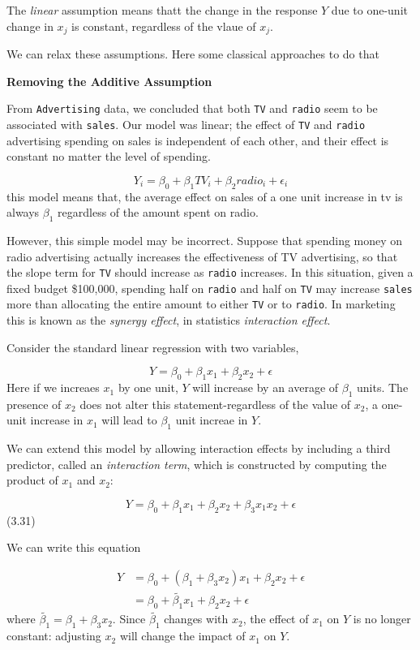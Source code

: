 \documentclass[
  letterpaper,
  DIV=11,
  numbers=noendperiod]{scrreprt}
\begin{document}
The \emph{linear} assumption means thatt the change in the response
\(Y\) due to one-unit change in \(x_j\) is constant, regardless of the
vlaue of \(x_j\).

We can relax these assumptions. Here some classical approaches to do
that

\textbf{Removing the Additive Assumption}

From \texttt{Advertising} data, we concluded that both \texttt{TV} and
\texttt{radio} seem to be associated with \texttt{sales}. Our model was
linear; the effect of \texttt{TV} and \texttt{radio} advertising
spending on sales is independent of each other, and their effect is
constant no matter the level of spending.

\[
Y_i = \beta_0 + \beta_1 TV_i + \beta_2 radio_i + \epsilon_i
\] this model means that, the average effect on sales of a one unit
increase in tv is always \(\beta_1\) regardless of the amount spent on
radio.

However, this simple model may be incorrect. Suppose that spending money
on radio advertising actually increases the effectiveness of TV
advertising, so that the slope term for \texttt{TV} should increase as
\texttt{radio} increases. In this situation, given a fixed budget
\$100,000, spending half on \texttt{radio} and half on \texttt{TV} may
increase \texttt{sales} more than allocating the entire amount to either
\texttt{TV} or to \texttt{radio}. In marketing this is known as the
\emph{synergy effect}, in statistics \emph{interaction effect}.

Consider the standard linear regression with two variables,

\[
Y = \beta_0 + \beta_1x_1 + \beta_2x_2 + \epsilon
\] Here if we increaes \(x_1\) by one unit, \(Y\) will increase by an
average of \(\beta_1\) units. The presence of \(x_2\) does not alter
this statement-regardless of the value of \(x_2\), a one-unit increase
in \(x_1\) will lead to \(\beta_1\) unit increae in \(Y\).

We can extend this model by allowing interaction effects by including a
third predictor, called an \emph{interaction term}, which is constructed
by computing the product of \(x_1\) and \(x_2\):

\[
Y = \beta_0 + \beta_1 x_1 + \beta_2 x_2 + \beta_3 x_1 x_2 + \epsilon
\] (3.31)

We can write this equation

\[
\begin{align}
Y &= \beta_0 + (\beta_1 + \beta_3 x_2)x_1 + \beta_2x_2 +\epsilon \\
&= \beta_0 + \tilde{\beta_1}x_1 + \beta_2x_2 + \epsilon
\end{align}
\] where \(\tilde{\beta_1} = \beta_1 + \beta_3x_2\). Since
\(\tilde{\beta_1}\) changes with \(x_2\), the effect of \(x_1\) on \(Y\)
is no longer constant: adjusting \(x_2\) will change the impact of
\(x_1\) on \(Y\).
\end{document}
